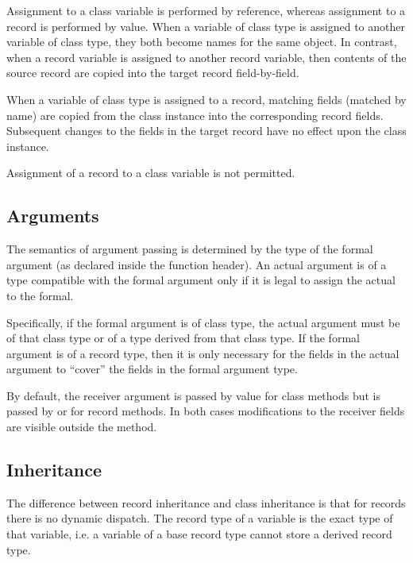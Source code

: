 Assignment to a class variable is performed by reference, whereas assignment to
a record is performed by value.  When a variable of class type is assigned to
another variable of class type, they both become names for the same object.  In
contrast, when a record variable is assigned to another record variable, then
contents of the source record are copied into the target record field-by-field.

When a variable of class type is assigned to a record, matching fields (matched
by name) are copied from the class instance into the corresponding record
fields.  Subsequent changes to the fields in the target record have no effect
upon the class instance.

Assignment of a record to a class variable is not permitted.

\subsection{Arguments}
\label{Argument_Differences}

The semantics of argument passing is determined by the type of the formal
argument (as declared inside the function header).  An actual argument is of a
type compatible with the formal argument only if it is legal to assign the
actual to the formal.

Specifically, if the formal argument is of class type, the actual argument must
be of that class type or of a type derived from that class type.  If the formal
argument is of a record type, then it is only necessary for the fields in the
actual argument to ``cover'' the fields in the formal argument type.

By default, the receiver argument is passed by value for class methods but is
passed by  or  for record methods.
In both cases modifications to the receiver fields are visible
outside the method.

\subsection{Inheritance}
\label{Inheritance_Differences}

The difference between record inheritance and class
inheritance is that for records there is no dynamic dispatch.  The record type of
a variable is the exact type of that variable, i.e. a variable of a
base record type cannot store a derived record type.

